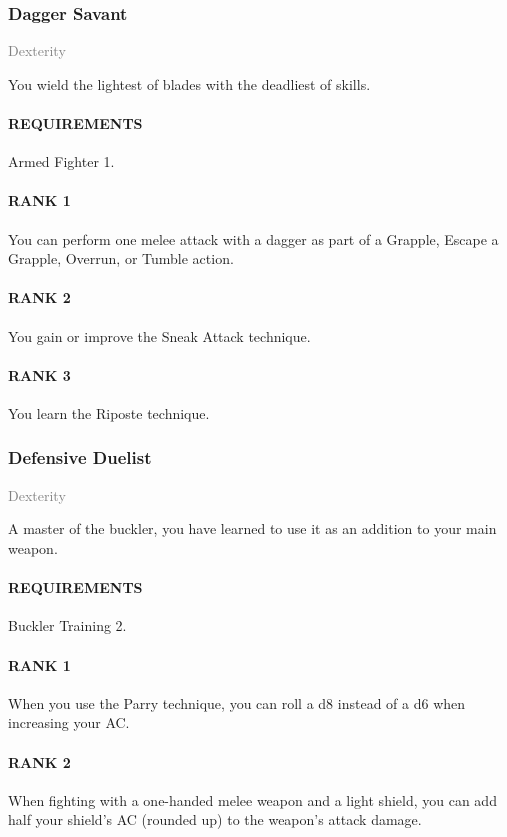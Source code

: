 \subsubsection{Dagger Savant} \label{tal::daggersavant}
\small{\textcolor{gray}{Dexterity}}

\normalsize
You wield the lightest of blades with the deadliest of skills.
\paragraph{REQUIREMENTS} Armed Fighter 1.
\paragraph{RANK 1} You can perform one melee attack with a dagger as part of a Grapple, Escape a Grapple, Overrun, or Tumble action.
\paragraph{RANK 2} You gain or improve the Sneak Attack technique.
\paragraph{RANK 3} You learn the Riposte technique.

\subsubsection{Defensive Duelist} \label{tal::defensiveduelist}
\small{\textcolor{gray}{Dexterity}}

\normalsize
A master of the buckler, you have learned to use it as an addition to your main weapon.
\paragraph{REQUIREMENTS} Buckler Training 2.
\paragraph{RANK 1} When you use the Parry technique, you can roll a d8 instead of a d6 when increasing your AC.
\paragraph{RANK 2} When fighting with a one-handed melee weapon and a light shield, you can add half your shield's AC (rounded up) to the weapon's attack damage.
